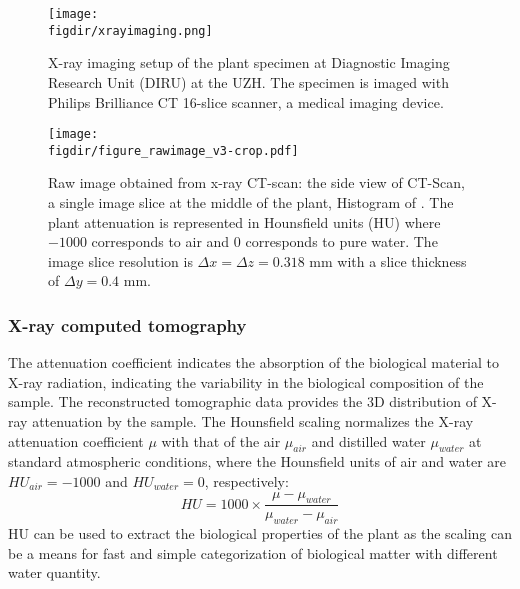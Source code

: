 
\begin{figure}[t]
	\centering
	\texttt{[image: \\figdir/xrayimaging.png]}
	\caption{X-ray imaging setup of the plant specimen at Diagnostic Imaging Research Unit (DIRU) at the UZH. The specimen is imaged with Philips Brilliance CT 16-slice scanner, a medical imaging device.}
	\label{fig:xrayimaging}
\end{figure}

\begin{figure}[p]
	\centering
	\texttt{[image: \\figdir/figure\_rawimage\_v3-crop.pdf]}
	\caption{Raw image obtained from x-ray CT-scan:  the side view of CT-Scan,  a single image slice at the middle of the plant,  Histogram of . The plant attenuation is represented in Hounsfield units (HU) where $-1000$ corresponds to air and $0$ corresponds to pure water. The image slice resolution is $\Delta x = \Delta z=0.318$ mm with a slice thickness of $\Delta y=0.4$ mm.}
	\label{fig:figure_rawimage}
\end{figure}


\subsubsection*{X-ray computed tomography}

The attenuation coefficient indicates the absorption of the biological material to X-ray radiation, indicating the variability in the biological composition of the sample. The reconstructed tomographic data provides the 3D distribution of X-ray attenuation by the sample. The Hounsfield scaling normalizes the X-ray attenuation coefficient $\mu$ with that of the air $\mu_{\textit{air}}$ and distilled water $\mu_{\textit{water}}$ at standard atmospheric conditions, where the Hounsfield units of air and water are $HU_{\textit{air}}=-1000$ and $HU_{\textit{water}}=0$, respectively:
\begin{equation}
HU = 1000 \times \frac{{\mu  - {\mu _{\textit{water}}}}}{{{\mu _{\textit{water}}} - {\mu _{\textit{air}}}}}
\end{equation}
HU can be used to extract the biological properties of the plant as the scaling can be a means for fast and simple categorization of biological matter with different water quantity. 

